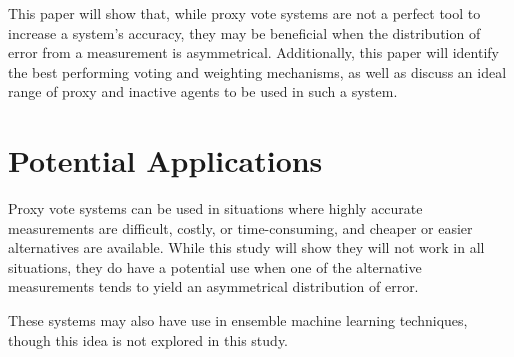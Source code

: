 This paper will show that, while proxy vote systems are not a perfect tool to
increase a system's accuracy, they may be beneficial when the distribution of error
from a measurement is asymmetrical.
Additionally, this paper will identify the best performing voting and weighting
mechanisms, as well as discuss an ideal range of proxy and inactive agents to be used
in such a system.


\section{Potential Applications}\label{sec:potential-applications}
Proxy vote systems can be used in situations where highly accurate measurements are
difficult, costly, or time-consuming, and cheaper or easier alternatives are available.
While this study will show they will not work in all situations, they do have a
potential use when one of the alternative measurements tends to yield an asymmetrical
distribution of error.

These systems may also have use in ensemble machine learning techniques, though this
idea is not explored in this study.
